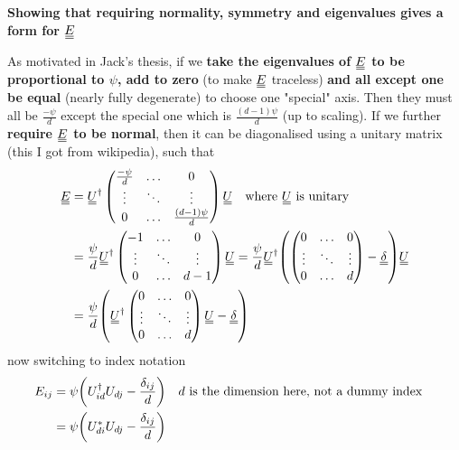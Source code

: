 \documentclass[11pt]{article}
\newcommand\textbff[1]{\textbf{\boldmath #1}}
\newcommand\barbelow[1]{\stackunder[1.2pt]{$#1$}{\rule{1.5ex}{.1ex}}}
\newcommand{\du}[1]{\barbelow{\barbelow{#1}}}
\begin{document}
\begin{center}
    \LARGE
    \textbf{Showing that requiring normality, symmetry and eigenvalues gives a form for $\du{E}$}
\end{center}
\vspace{1em}

As motivated in Jack's thesis, if we \textbff{take the eigenvalues of $\du{E}$ to be proportional to $\psi$, add to zero} (to make $\du{E}$ traceless) \textbff{and all except one be equal} (nearly fully degenerate) to choose one "special" axis.
Then they must all be $\frac{-\psi}{d}$ except the special one which is $\frac{(d-1)\psi}{d}$ (up to scaling).
If we further \textbff{require $\du{E}$ to be normal}, then it can be diagonalised using a unitary matrix (this I got from wikipedia), such that
\begin{align}
    \du{E} &= \du{U}^\dagger \begin{pmatrix}
        \frac{-\psi}{d} & \dots & 0 \\
        \vdots & \ddots & \vdots\\
        0 & \dots & \frac{(d-1)\psi}{d}
    \end{pmatrix} \du{U} \qq{where $\du{U}$ is unitary} \\
    &= \frac{\psi}{d} \du{U}^\dagger \begin{pmatrix}
        -1 & \dots & 0 \\
        \vdots & \ddots & \vdots\\
        0 & \dots & d-1
    \end{pmatrix} \du{U} = \frac{\psi}{d} \du{U}^\dagger \qty(\begin{pmatrix}
        0 & \dots & 0 \\
        \vdots & \ddots & \vdots\\
        0 & \dots & d
    \end{pmatrix} - \du{\delta}) \du{U} \\
    &= \frac{\psi}{d} \qty(\du{U}^\dagger \begin{pmatrix}
        0 & \dots & 0 \\
        \vdots & \ddots & \vdots\\
        0 & \dots & d
    \end{pmatrix} \du{U} - \du{\delta}) \\
\end{align}
now switching to index notation
\begin{align}
    E_{ij} &= \psi \qty(U^\dagger_{id}U_{dj} - \frac{\delta_{ij}}{d}) \qq{$d$ is the dimension here, not a dummy index} \\
    &= \psi \qty(U^*_{di}U_{dj} - \frac{\delta_{ij}}{d})
\end{align}
\end{document}
